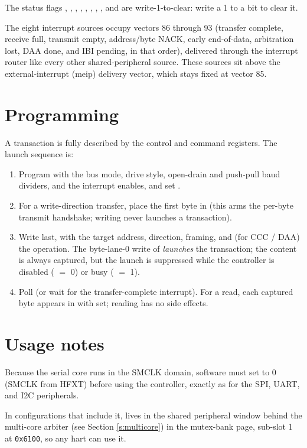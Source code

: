 The status flags , , , , , , , , and  are write-1-to-clear: write a 1 to a bit to clear it.

The eight interrupt sources occupy vectors 86 through 93 (transfer complete, receive full, transmit empty, address/byte NACK, early end-of-data, arbitration lost, DAA done, and IBI pending, in that order), delivered through the interrupt router like every other shared-peripheral source. These sources sit above the external-interrupt (meip) delivery vector, which stays fixed at vector 85.

\section{Programming}

A transaction is fully described by the control and command registers. The launch sequence is:

\begin{enumerate}
	\item Program  with the bus mode, drive style, open-drain and push-pull baud dividers, and the interrupt enables, and set .
	\item For a write-direction transfer, place the first byte in  (this arms the per-byte transmit handshake; writing  never launches a transaction).
	\item Write  last, with the target address, direction, framing, and (for CCC / DAA) the operation. The byte-lane-0 write of  \emph{launches} the transaction; the content is always captured, but the launch is suppressed while the controller is disabled ( $=$ 0) or busy ( $=$ 1).
	\item Poll  (or wait for the transfer-complete interrupt). For a read, each captured byte appears in  with  set; reading  has no side effects.
\end{enumerate}

\section{Usage notes}

Because the serial core runs in the SMCLK domain, software must set  to 0 (SMCLK from HFXT) before using the controller, exactly as for the SPI, UART, and I2C peripherals.

In configurations that include it,  lives in the shared peripheral window behind the multi-core arbiter (see Section \ref{s:multicore}) in the mutex-bank page, sub-slot 1 at \texttt{0x6100}, so any hart can use it.
